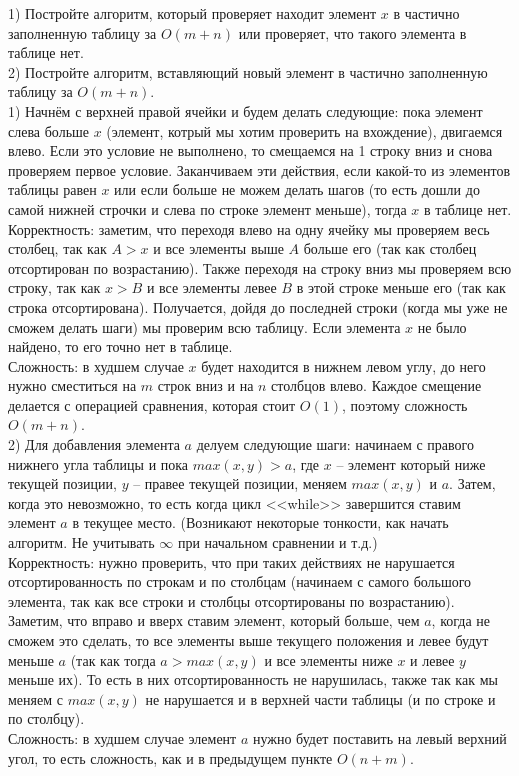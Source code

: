 \documentclass[a4paper,12pt]{article} %
\begin{document}
1)  Постройте алгоритм, который проверяет находит элемент $x$ в  частично заполненную таблицу за $O(m+n)$ или проверяет, что такого элемента в таблице нет.\\

2) Постройте алгоритм, вставляющий новый элемент в частично заполненную таблицу за $O(m+n)$.\\

1) Начнём с верхней правой ячейки и будем делать следующие: пока элемент слева больше $ x $ (элемент, котрый мы хотим проверить на вхождение), двигаемся влево. Если это условие не выполнено, то смещаемся на 1 строку вниз и снова проверяем первое условие. Заканчиваем эти действия, если какой-то из элементов таблицы равен $ x $ или если больше не можем делать шагов (то есть дошли до самой нижней строчки и слева по строке элемент меньше), тогда $ x $ в таблице нет.\\

Корректность: заметим, что переходя влево на одну ячейку мы проверяем весь столбец, так как $ A > x $ и все элементы выше $ A $ больше его (так как столбец отсортирован по возрастанию). Также переходя на строку вниз мы проверяем всю строку, так как $ x > B $ и все элементы левее $ B $ в этой строке меньше его (так как строка отсортирована). Получается, дойдя до последней строки (когда мы уже не сможем делать шаги) мы проверим всю таблицу. Если элемента $ x $ не было найдено, то его точно нет в таблице.\\

Сложность: в худшем случае $ x $ будет находится в нижнем левом углу, до него нужно сместиться на $ m $ строк вниз и на $ n $ столбцов влево. Каждое смещение делается с операцией сравнения, которая стоит $ O(1) $, поэтому сложность $ O(m+n) $.\\

2) Для добавления элемента $ a $ делуем следующие шаги: начинаем с правого нижнего угла таблицы и пока $ max(x,y) > a $, где $ x $ -- элемент который ниже текущей позиции, $ y $ -- правее текущей позиции, меняем $ max(x, y) $ и $ a $. Затем, когда это невозможно, то есть когда цикл <<while>> завершится ставим элемент $ a $ в текущее место. (Возникают некоторые тонкости, как начать алгоритм. Не учитывать $ \infty $ при начальном сравнении и т.д.)\\

Корректность: нужно проверить, что при таких действиях не нарушается отсортированность по строкам и по столбцам (начинаем с самого большого элемента, так как все строки и столбцы отсортированы по возрастанию). Заметим, что вправо и вверх ставим элемент, который больше, чем $ a $, когда не сможем это сделать, то все элементы выше текущего положения и левее будут меньше $ a $ (так как тогда $ a > max(x,y) $ и все элементы ниже $ x $ и левее $ y $ меньше их). То есть в них отсортированность не нарушилась, также так как мы меняем с $ max(x,y) $ не нарушается и в верхней части таблицы (и по строке и по столбцу).\\

Сложность: в худшем случае элемент $ a $ нужно будет поставить на левый верхний угол, то есть сложность, как и в предыдущем пункте $ O(n+m) $.
\end{document}
